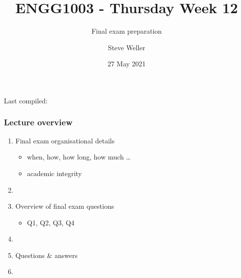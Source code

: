 \documentclass[english,14pt]{beamer}
\title{ENGG1003 - Thursday Week 12}
\subtitle{Final exam preparation}
\author{Steve Weller}
\institute{University of Newcastle}
\date{27 May 2021}
\begin{document}
\begin{flushleft}
{\scriptsize Last compiled:~\DTMnow}
\vspace*{-5mm}
\end{flushleft}
\framebreak


\begin{frame}[fragile]

\frametitle{Lecture overview}
\begin{enumerate}
	\item Final exam organisational details
	\begin{itemize}
		\item when, how, how long, how much \ldots
		\item academic integrity
	\end{itemize}
	
	\item[]
	
	\item Overview of final exam questions
	\begin{itemize}
		\item Q1, Q2, Q3, Q4
	\end{itemize}

	\item[]
	
	\item Questions \& answers

	\item[]

\end{enumerate}

\end{frame}

\end{document}
